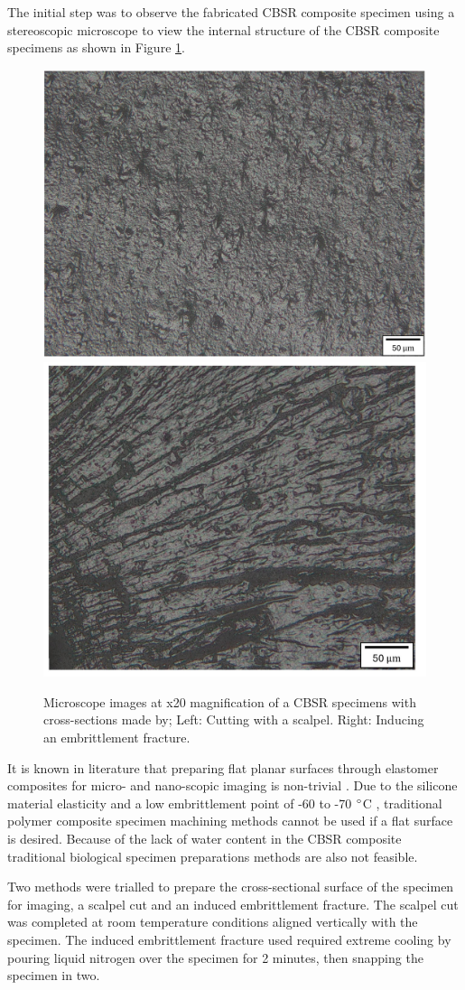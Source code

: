 The initial step was to observe the fabricated CBSR composite specimen using a stereoscopic microscope to view the internal structure of the CBSR composite specimens as shown in Figure \ref{fig:CBSR_8p_uscope_scalpel_frac}.
\begin{figure}[H]
	\centering
	\includegraphics[width=0.4\linewidth]{Figures/scpl_cut_loc1_20x_CBSR_wt8.jpg}
	\hspace{0.5cm}
	\includegraphics[width=0.37\linewidth]{Figures/br_frac_loc2_20x_CBSR_8wt.jpg}
	\caption{Microscope images at x20 magnification of a CBSR specimens with cross-sections made by; Left: Cutting with a scalpel. Right: Inducing an embrittlement fracture.}
	\label{fig:CBSR_8p_uscope_scalpel_frac}
\end{figure}
It is known in literature that preparing flat planar surfaces through elastomer composites for micro- and nano-scopic imaging is non-trivial \cite{Luo2005}. Due to the silicone material elasticity and a low embrittlement point of -60 to -70 $\degree$C , traditional polymer composite specimen machining methods cannot be used if a flat surface is desired. Because of the lack of water content in the CBSR composite traditional biological specimen preparations methods are also not feasible. 

Two methods were trialled to prepare the cross-sectional surface of the specimen for imaging, a scalpel cut and an induced embrittlement fracture. The scalpel cut was completed at room temperature conditions aligned vertically with the specimen. The induced embrittlement fracture used required extreme cooling by pouring liquid nitrogen over the specimen for 2 minutes, then snapping the specimen in two.

